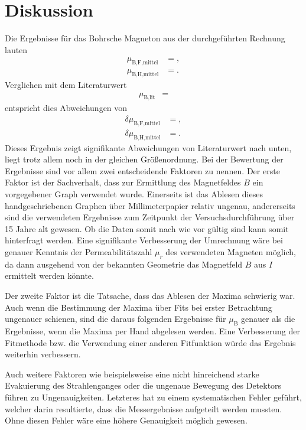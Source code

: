 \section{Diskussion}
\label{sec:Diskussion}

Die Ergebnisse für das Bohrsche Magneton aus der durchgeführten Rechnung lauten
\begin{align*}
  \mu_{\text{B,F,mittel}} &= ,\\
  \mu_{\text{B,H,mittel}} &= .
\end{align*}
Verglichen mit dem Literaturwert \cite{Konstanten}
\begin{align*}
  \mu_{\text{B,lit}} &= 
\end{align*}
entspricht dies Abweichungen von
\begin{align*}
  \delta \mu_{\text{B,F,mittel}} &= ,\\
  \delta \mu_{\text{B,H,mittel}} &= .
\end{align*}
Dieses Ergebnis zeigt signifikante Abweichungen von Literaturwert nach unten, liegt trotz allem noch in der gleichen Größenordnung.
Bei der Bewertung der Ergebnisse sind vor allem zwei entscheidende Faktoren zu nennen.
Der erste Faktor ist der Sachverhalt, dass zur Ermittlung des Magnetfeldes $B$ ein vorgegebener Graph verwendet wurde.
Einerseits ist das Ablesen dieses handgeschriebenen Graphen über Millimeterpapier relativ ungenau, andererseits sind die verwendeten Ergebnisse zum Zeitpunkt der Versuchsdurchführung über 15 Jahre alt gewesen.
Ob die Daten somit nach wie vor gültig sind kann somit hinterfragt werden.
Eine signifikante Verbesserung der Umrechnung wäre bei genauer Kenntnis der Permeabilitätszahl $\mu_r$ des verwendeten Magneten möglich, da dann ausgehend von der bekannten Geometrie das Magnetfeld $B$ aus $I$ ermittelt werden könnte.

Der zweite Faktor ist die Tatsache, dass das Ablesen der Maxima schwierig war.
Auch wenn die Bestimmung der Maxima über Fits bei erster Betrachtung ungenauer schienen, sind die daraus folgenden Ergebnisse für $\mu_\text{B}$ genauer als die Ergebnisse, wenn die Maxima per Hand abgelesen werden.
Eine Verbesserung der Fitmethode bzw. die Verwendung einer anderen Fitfunktion würde das Ergebnis weiterhin verbessern.

Auch weitere Faktoren wie beispielsweise eine nicht hinreichend starke Evakuierung des Strahlenganges oder die ungenaue Bewegung des Detektors führen zu Ungenauigkeiten.
Letzteres hat zu einem systematischen Fehler geführt, welcher darin resultierte, dass die Messergebnisse aufgeteilt werden mussten.
Ohne diesen Fehler wäre eine höhere Genauigkeit möglich gewesen.
